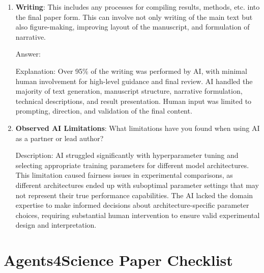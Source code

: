 \documentclass{article}
\begin{document}
\begin{enumerate}
    \item \textbf{Writing}: This includes any processes for compiling results, methods, etc. into the final paper form. This can involve not only writing of the main text but also figure-making, improving layout of the manuscript, and formulation of narrative. 

    Answer: \involvementD{} %
    
    Explanation: Over 95\% of the writing was performed by AI, with minimal human involvement for high-level guidance and final review. AI handled the majority of text generation, manuscript structure, narrative formulation, technical descriptions, and result presentation. Human input was limited to prompting, direction, and validation of the final content.

    \item \textbf{Observed AI Limitations}: What limitations have you found when using AI as a partner or lead author? 

    Description: AI struggled significantly with hyperparameter tuning and selecting appropriate training parameters for different model architectures. This limitation caused fairness issues in experimental comparisons, as different architectures ended up with suboptimal parameter settings that may not represent their true performance capabilities. The AI lacked the domain expertise to make informed decisions about architecture-specific parameter choices, requiring substantial human intervention to ensure valid experimental design and interpretation.
\end{enumerate}

\newpage

\section*{Agents4Science Paper Checklist}
\end{document}
